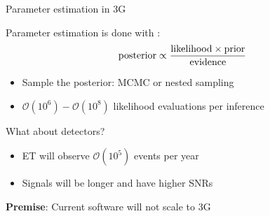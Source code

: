 \documentclass[usenames,dvipsnames,t]{beamer}
\begin{document}
\begin{frame}{Parameter estimation in 3G}
  \def\x{3mm}
  \def\y{5mm}

  Parameter estimation is done with :
  \begin{equation*}
    \rm{posterior} \propto \frac{\rm{likelihood} \times \rm{prior}}{\rm{evidence}}
  \end{equation*}

  \begin{itemize}
    \item Sample the posterior: MCMC or nested sampling

    \item $\mathcal{O}(10^6) - \mathcal{O}(10^8)$ likelihood evaluations per inference
  \end{itemize}
  
  \pause
  \vspace{\y}
  
  What about  detectors?
  \begin{itemize}
    \item ET will observe $\mathcal{O}(10^5)$ events per year
    
    \item Signals will be longer and have higher SNRs
  \end{itemize}

  \pause
  \vspace{\y}

  \begin{tcolorbox}[colback=blue!10, boxrule=0pt]
    \textbf{Premise}: Current software will not scale to 3G~\cite{Hu:2024mvn}
  \end{tcolorbox}

\end{frame}





\end{document}
